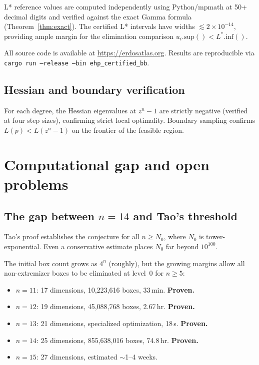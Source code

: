 \documentclass[11pt]{article}
\theoremstyle{plain}
\theoremstyle{definition}
\theoremstyle{remark}
\begin{document}
L* reference values are computed independently using Python/mpmath at 50+ decimal digits and verified against the exact Gamma formula (Theorem~\ref{thm:exact}). The certified L* intervals have widths $\lesssim 2 \times 10^{-14}$, providing ample margin for the elimination comparison $u_i.\mathrm{sup}() < L^*.\mathrm{inf}()$.

All source code is available at \url{https://erdosatlas.org}. Results are reproducible via \texttt{cargo run --release --bin ehp\_certified\_bb}.

\subsection{Hessian and boundary verification}

For each degree, the Hessian eigenvalues at $z^n - 1$ are strictly negative (verified at four step sizes), confirming strict local optimality. Boundary sampling confirms $L(p) < L(z^n - 1)$ on the frontier of the feasible region.

\section{Computational gap and open problems}
\label{sec:gap}

\subsection{The gap between $n = 14$ and Tao's threshold}

Tao's proof establishes the conjecture for all $n \geq N_0$, where $N_0$ is tower-exponential. Even a conservative estimate places $N_0$ far beyond $10^{100}$.

The initial box count grows as $4^{n}$ (roughly), but the growing margins allow all non-extremizer boxes to be eliminated at level~0 for $n \geq 5$:
\begin{itemize}[nosep]
\item $n = 11$: 17 dimensions, 10{,}223{,}616 boxes, 33\,min. \textbf{Proven.}
\item $n = 12$: 19 dimensions, 45{,}088{,}768 boxes, 2.67\,hr. \textbf{Proven.}
\item $n = 13$: 21 dimensions, specialized optimization, 18\,s. \textbf{Proven.}
\item $n = 14$: 25 dimensions, 855{,}638{,}016 boxes, 74.8\,hr. \textbf{Proven.}
\item $n = 15$: 27 dimensions, estimated $\sim$1--4 weeks.
\end{itemize}
\end{document}
